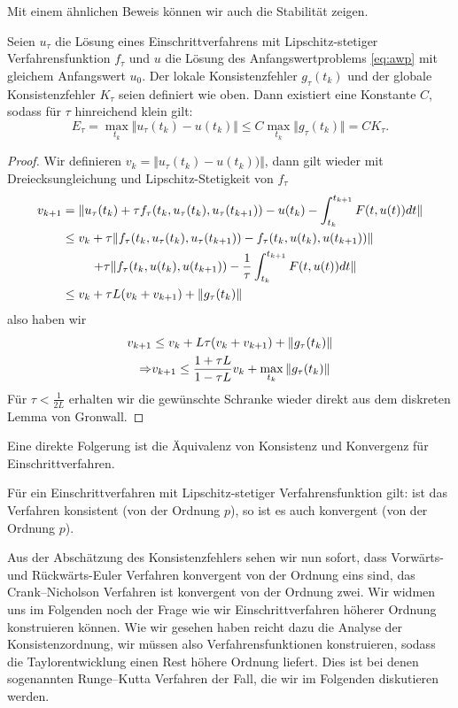 Mit einem ähnlichen Beweis können wir auch die Stabilität zeigen.
%
\begin{theorem}{}{}
Seien $u_\tau$ die Lösung eines Einschrittverfahrens mit Lipschitz-stetiger Verfahrensfunktion $f_\tau$ und $u$ die Lösung des Anfangswertproblems \eqref{eq:awp} mit gleichem Anfangswert $u_0$. Der lokale Konsistenzfehler $g_\tau(t_k)$ und der globale Konsistenzfehler $K_\tau$ seien definiert wie oben. Dann existiert eine Konstante $C$, sodass für $\tau$ hinreichend klein  gilt:
$$ E_\tau = \max_{t_k} \Vert u_\tau(t_k) - u(t_k) \Vert \leq C \max_{t_k} \Vert g_\tau(t_k) \Vert = C K_\tau. $$
\end{theorem}
%
\begin{proof}
Wir definieren $v_k = \Vert u_\tau(t_{k}) -u(t_k)) \Vert$, dann gilt wieder mit Dreiecksungleichung und Lipschitz-Stetigkeit von $f_\tau$
%
\begin{align*}
v_{k+1} &= \norm{ u_\tau(t_k) + \tau f_\tau(t_k, u_\tau(t_k), u_\tau(t_{k+1})) - u(t_k) -\int_{t_k}^{t_{k+1}} F(t,u(t)) dt}\\
&\leq
%
v_k + \tau \norm{f_\tau(t_k, u_\tau(t_k), u_\tau(t_{k+1})) - f_\tau(t_k, u(t_k), u(t_{k+1}))}\\
&\mathrel{\phantom{\leq v_k}}
+\tau 
\norm{f_\tau(t_k, u(t_k), u(t_{k+1})) - \frac{1}{\tau} \int_{t_k}^{t_{k+1}} F(t,u(t)) dt}\\
%
&\leq
%
v_k + \tau L (v_k + v_{k+1}) + \norm{g_\tau(t_k)}
\end{align*}
%
also haben wir
%
\begin{align*}
v_{k+1} &\leq v_k + L \tau (v_k + v_{k+1}) + \Vert g_\tau(t_k) \Vert\\
\Rightarrow
&v_{k+1} \leq \frac{1+\tau L}{1-\tau L} v_k + \max_{t_k}\|g_\tau(t_k)\|
\end{align*}
Für $\tau < \frac{1}{2L}$ erhalten wir die gewünschte Schranke wieder direkt aus dem diskreten Lemma von Gronwall.
\end{proof}

Eine direkte Folgerung ist die Äquivalenz von Konsistenz und Konvergenz für Einschrittverfahren.
%
\begin{corollary}{}{}
Für ein Einschrittverfahren mit Lipschitz-stetiger Verfahrensfunktion gilt: ist das Verfahren konsistent (von der Ordnung $p$), so ist es auch konvergent (von der Ordnung $p$).
\end{corollary}
%
Aus der Abschätzung des Konsistenzfehlers sehen wir nun sofort, dass Vorwärts- und Rückwärts-Euler Verfahren konvergent von der Ordnung eins sind, das Crank--Nicholson Verfahren ist konvergent von der Ordnung zwei. Wir widmen uns im Folgenden noch der Frage wie wir Einschrittverfahren höherer Ordnung konstruieren können. Wie wir gesehen haben reicht dazu die Analyse der Konsistenzordnung, wir müssen also Verfahrensfunktionen konstruieren, sodass die Taylorentwicklung einen Rest höhere Ordnung liefert. Dies ist bei denen sogenannten Runge--Kutta Verfahren der Fall, die wir im Folgenden diskutieren werden.
%
